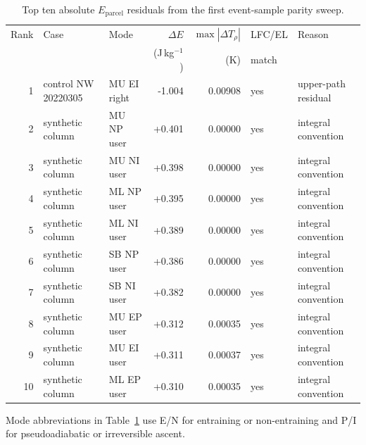 \documentclass[11pt]{article}
\begin{document}
\begin{table}[H]
\centering
\scriptsize
\setlength{\tabcolsep}{2.5pt}
\caption{Top ten absolute $E_{\mathrm{parcel}}$ residuals from the first event-sample parity sweep.}
\label{tab:worst10}
\begin{tabular}{rllrrll}
\toprule
Rank & Case & Mode & $\Delta E$ & $\max|\Delta T_\rho|$ & LFC/EL & Reason \\
 & & & (J\,kg$^{-1}$) & (K) & match & \\
\midrule
1 & control NW 20220305 & MU EI right & -1.004 & 0.00908 & yes & upper-path residual \\
2 & synthetic column & MU NP user & +0.401 & 0.00000 & yes & integral convention \\
3 & synthetic column & MU NI user & +0.398 & 0.00000 & yes & integral convention \\
4 & synthetic column & ML NP user & +0.395 & 0.00000 & yes & integral convention \\
5 & synthetic column & ML NI user & +0.389 & 0.00000 & yes & integral convention \\
6 & synthetic column & SB NP user & +0.386 & 0.00000 & yes & integral convention \\
7 & synthetic column & SB NI user & +0.382 & 0.00000 & yes & integral convention \\
8 & synthetic column & MU EP user & +0.312 & 0.00035 & yes & integral convention \\
9 & synthetic column & MU EI user & +0.311 & 0.00037 & yes & integral convention \\
10 & synthetic column & ML EP user & +0.310 & 0.00035 & yes & integral convention \\
\bottomrule
\end{tabular}
\end{table}

Mode abbreviations in Table~\ref{tab:worst10} use E/N for entraining or non-entraining and P/I for pseudoadiabatic or irreversible ascent.
\end{document}
